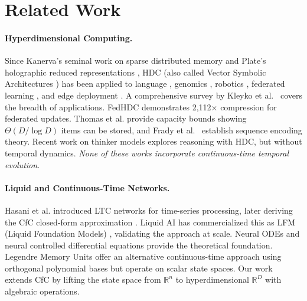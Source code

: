 \documentclass{article}
\newcommand{\R}{\mathbb{R}}
\begin{document}
\section{Related Work}
\label{sec:related}

\paragraph{Hyperdimensional Computing.} Since Kanerva's seminal work on sparse distributed memory \cite{kanerva2009hyperdimensional} and Plate's holographic reduced representations \cite{plate2003holographic}, HDC (also called Vector Symbolic Architectures \cite{gayler2003vector,schlegel2022comparison}) has been applied to language \cite{joshi2016language}, genomics \cite{kim2020geniehd}, robotics \cite{neubert2019introduction}, federated learning \cite{xu2024fedhdc}, and edge deployment \cite{rubino2021ultra}. A comprehensive survey by Kleyko et al.~\cite{kleyko2023survey} covers the breadth of applications. FedHDC \cite{xu2024fedhdc} demonstrates 2,112$\times$ compression for federated updates. Thomas et al. \cite{thomas2021theoretical} provide capacity bounds showing $\Theta(D / \log D)$ items can be stored, and Frady et al.~\cite{frady2018theory} establish sequence encoding theory. Recent work on thinker models \cite{hersche2023thinker} explores reasoning with HDC, but without temporal dynamics. \emph{None of these works incorporate continuous-time temporal evolution.}

\paragraph{Liquid and Continuous-Time Networks.} Hasani et al. \cite{hasani2021liquid} introduced LTC networks for time-series processing, later deriving the CfC closed-form approximation \cite{hasani2022closed}. Liquid AI has commercialized this as LFM (Liquid Foundation Models) \cite{liquidai2024lfm}, validating the approach at scale. Neural ODEs \cite{chen2018neural} and neural controlled differential equations \cite{kidger2022neural} provide the theoretical foundation. Legendre Memory Units \cite{voelker2019legendre} offer an alternative continuous-time approach using orthogonal polynomial bases but operate on scalar state spaces. Our work extends CfC by lifting the state space from $\R^n$ to hyperdimensional $\R^D$ with algebraic operations.
\end{document}

